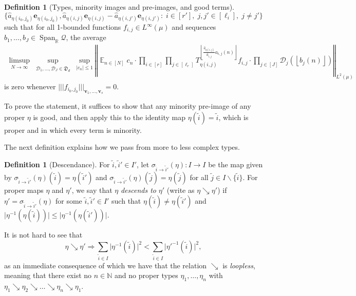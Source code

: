 \documentclass[11pt]{amsart}
\theoremstyle{definition}
\newtheorem{definition}[lemma]{Definition}
\DeclareMathOperator*{\E}{\mathbb{E}}
\newcommand{\N}{{\mathbb N}}
\newcommand{\R}{{\mathbb R}}
\newcommand{\CD}{{\mathcal D}}
\newcommand{\CQ}{{\mathcal Q}}
\newcommand{\FD}{{\mathfrak D}}
\newcommand{\be}{{\mathbf{e}}}
\newcommand{\bv}{{\mathbf{v}}}
\newcommand{\norm}[1]{\left\Vert #1\right\Vert}
\newcommand{\nnorm}[1]{\lvert\!|\!| #1|\!|\!\rvert}
\newcommand{\1}{{\mathbf{1}}}
\DeclareMathOperator{\Span}{Span}
\newcommand{\floor}[1]{{\left \lfloor #1 \right \rfloor}}
\begin{document}
\begin{definition}[Types, minority images and pre-images, and good terms]
             $$
             \{\hat{a}_{\eta(i_{0},j_{0})}\be_{\eta(i_{0},j_{0})},\hat{a}_{\eta(i,j)}\be_{\eta(i,j)}-\hat{a}_{\eta(i,j')}\be_{\eta(i,j')}:\; i\in[r'],\; j,j'\in[\ell_{i}],\; j\neq j'\}$$
         such that for all 1-bounded functions $f_{i,j}\in L^\infty(\mu)$ and sequences $b_1, \ldots, b_J\in\Span_\R\CQ$, the average 
\begin{multline}\label{E: average to be controled}
         \limsup_{N\to\infty}\sup_{\substack{
         \CD_1, \ldots, \CD_J \in \FD_d}} \sup_{|c_n|\leq 1}\norm{\E_{n\in [N]} c_{n}\cdot \prod_{i\in[r]}\prod_{j\in[\ell_{r}]}  T_{\eta(i,j)}^{\floor{\frac{\hat{a}_{\eta(i,j)}}{\hat{a}_{i,j}}a_{i,j}(n)}} f_{i,j}\cdot \prod_{j\in[J]}\CD_j(\floor{b_j(n)})}_{L^2(\mu)}%
    \end{multline}
    is zero whenever $\nnorm{f_{i_{0},j_{0}}}_{\bv_{1},\dots,\bv_{s}}=0$.

\end{definition}
    
   
   To prove the statement, it suffices to show that any minority pre-image of any proper $\eta$  is good, and then apply this to the identity map $\eta(\tilde{i})=\tilde{i}$, which is proper and in which every term is minority.

    The next definition explains how we pass from more to less complex types.
    \begin{definition}[Descendance] %
   For $\tilde{i},\tilde{i}'\in I'$, let $\sigma_{\tilde{i}\to \tilde{i}'}(\eta)\colon I\to I$ be the map given by $\sigma_{\tilde{i}\to \tilde{i}'}(\eta)(\tilde{i})=\eta(\tilde{i}')$ and $\sigma_{\tilde{i}\to \tilde{i}'}(\eta)(\tilde{j})=\eta(\tilde{j})$ for all  $\tilde{j}\in I\backslash\{\tilde{i}\}$. For proper maps $\eta$ and $\eta'$, we say that $\eta$ \emph{descends to} $\eta'$ (write as $\eta\searrow \eta'$) if $\eta'=\sigma_{\tilde{i}\to \tilde{i}'}(\eta)$ for some $\tilde{i},\tilde{i}'\in I'$ such that $\eta(\tilde{i})\neq \eta(\tilde{i}')$ and $\vert\eta^{-1}(\eta(\tilde{i}))\vert\leq \vert\eta^{-1}(\eta(\tilde{i}'))\vert$.     
    \end{definition}
   It is not hard to see that
   \begin{equation}\nonumber
      \eta\searrow \eta'\Rightarrow \sum_{\tilde{i}\in I}\vert\eta^{-1}(\tilde{i})\vert^{2}<\sum_{\tilde{i}\in I}\vert{\eta'}^{-1}(\tilde{i})\vert^{2},
   \end{equation}
 as an immediate consequence of which we have that the relation $\searrow$ is \emph{loopless}, meaning that there exist no $n\in\N$ and no proper types $\eta_{1},\dots,\eta_{n}$ with $\eta_{1}\searrow \eta_{2}\searrow\dots\searrow\eta_{n}\searrow\eta_{1}$.
\end{document}
